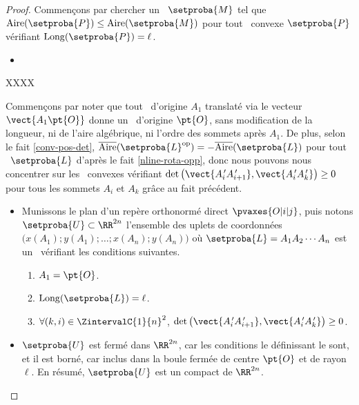 \begin{proof}
	Commençons par chercher un \ncycle\ $\setproba{M}$ tel que $\area{\setproba{P}} \leq \area{\setproba{M}}$ pour tout \ngone\ convexe $\setproba{P}$ vérifiant $\cyclelen{\setproba{P}} = \ell$.
	\begin{itemize}
		\item 
    \end{itemize}
    
    
	
	XXXX
	
	
	Commençons par noter que tout \ncycle\ d'origine $A_1$ translaté via le vecteur $\vect{A_1 \pt{O}}$ donne un \ncycle\ d'origine $\pt{O}$, sans modification de la longueur, ni de l'aire algébrique, ni l'ordre des sommets après $A_1$.
    De plus, selon le fait \ref{conv-pos-det},
    $\sarea{\setproba{L}^{\mathrm{op}}} = - \sarea{\setproba{L}}$ pour tout \ncycle\ $\setproba{L}$ d'après le fait \ref{nline-rota-opp}, donc nous pouvons nous concentrer sur les \ncycles\ convexes vérifiant $\det \big( \vect{A^{\,\prime}_i A^{\,\prime}_{i+1}}, \vect{A^{\,\prime}_i A^{\,\prime}_k} \big) \geq 0$ pour tous les sommets $A_i$ et $A_k$ grâce au fait précédent.


	\begin{itemize}
		\item Munissons le plan d'un repère orthonormé direct $\pvaxes{O | i | j}$, puis notons $\setproba{U} \subset \RR^{2n}$ l'ensemble des uplets de coordonnées $\big( x(A_1) ; y(A_1) ; \dots ; x(A_n) ; y(A_n) \big)$ où $\setproba{L} = A_1 A_2 \cdots A_n$ est un \ncycle\ vérifiant les conditions suivantes.
	    \begin{enumerate}
	    	\item $A_1 = \pt{O}$.

	    	\item $\cyclelen{\setproba{L}} = \ell$.

		    \item
		    $\forall (k, i) \in \ZintervalC{1}{n}^2$,
		    $\det \big( \vect{A^{\,\prime}_i A^{\,\prime}_{i+1}}, \vect{A^{\,\prime}_i A^{\,\prime}_k} \big) \geq 0$.
	    \end{enumerate}


        \item $\setproba{U}$ est fermé dans $\RR^{2n}$, car les conditions le définissant le sont, et il est borné, car inclus dans la boule fermée de centre $\pt{O}$ et de rayon $\ell$.
        En résumé, $\setproba{U}$ est un compact de $\RR^{2n}$.



\end{itemize}
\end{proof}
